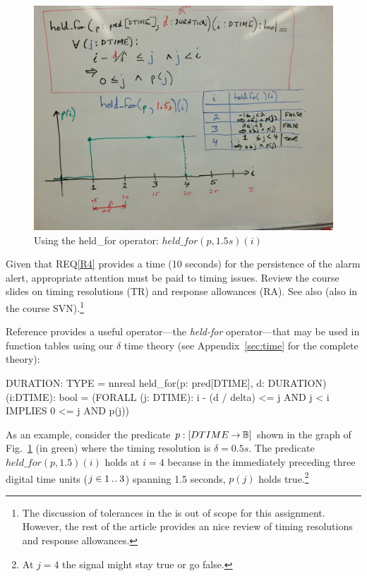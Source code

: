 \begin{figure}[htbp]
\begin{center}
\includegraphics[width=\textwidth]{pics/held-for.jpg}
\caption{Using the held\_for operator: $held\_for(p,1.5s)(i)$}
\label{fig:held}
\end{center}
\end{figure}

Given that REQ\ref{R4} provides a time (10 seconds) for the persistence of the alarm alert, appropriate attention must be paid to timing issues. Review the course slides on timing resolutions (TR) and response allowances (RA). See also \cite{WLH05} (also in the course SVN).\footnote{%
The discussion of tolerances in the \cite{WLH05}  is out of scope for this assignment. However, the rest of the article provides an nice review of timing resolutions and response allowances.}

Reference \cite{WLH05} provides a useful operator---the \emph{held-for} operator---that may be used in function tables using  our $\delta$ time theory (see Appendix~\ref{sec:time} for the complete theory):

\begin{pvs}
  DURATION: TYPE = nnreal
  held_for(p: pred[DTIME], d: DURATION)(i:DTIME): bool =
    (FORALL (j: DTIME): 
    i - (d / delta) <= j AND j < i IMPLIES 0 <= j AND p(j))
\end{pvs}


As an example, consider the predicate $p: [DTIME \mathbin\rightarrow \mathbb{B}]$ shown in the graph of Fig.~\ref{fig:held} (in green) where the timing resolution is $\delta = 0.5s$. The predicate $held\_for(p,1.5)(i)$ holds at $i=4$ because in the immediately preceding three digital time units ($j \in 1\mathbin{.\mkern1mu.}3$) spanning 1.5 seconds, $p(j)$ holds true.\footnote{%
At $j=4$ the signal might stay true or go false.}

